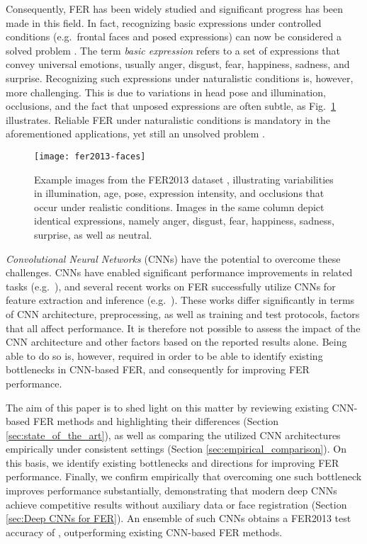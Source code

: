 \documentclass[conference,10pt,a4paper]{IEEEtran}
\begin{document}
Consequently, FER has been widely studied and significant progress has been made in this field. In fact, recognizing basic expressions under controlled conditions (e.g.~frontal faces and posed expressions) can now be considered a solved problem \cite{sariyanidi15}. The term \emph{basic expression} refers to a set of expressions that convey universal emotions, usually anger, disgust, fear, happiness, sadness, and surprise. Recognizing such expressions under naturalistic conditions is, however, more challenging. This is due to variations in head pose and illumination, occlusions, and the fact that unposed expressions are often subtle, as Fig.~\ref{fig:fer2013-faces} illustrates. Reliable FER under naturalistic conditions is mandatory in the aforementioned applications, yet still an unsolved problem \cite{sariyanidi15,martinez16}.

\begin{figure}[!t]
\centering
\texttt{[image: fer2013-faces]}
\caption{Example images from the FER2013 dataset \cite{goodfellow15}, illustrating variabilities in illumination, age, pose, expression intensity, and occlusions that occur under realistic conditions. Images in the same column depict identical expressions, namely anger, disgust, fear, happiness, sadness, surprise, as well as neutral.}
\label{fig:fer2013-faces}
\end{figure}



\emph{Convolutional Neural Networks} (CNNs) have the potential to overcome these challenges. CNNs have enabled significant performance improvements in related tasks (e.g.~\cite{krizhevsky12,he15,schroff15}), and several recent works on FER successfully utilize CNNs for feature extraction and inference (e.g.~\cite{tang13,yu15,kim16cvpr}). These works differ significantly in terms of CNN architecture, preprocessing, as well as training and test protocols, factors that all affect performance. It is therefore not possible to assess the impact of the CNN architecture and other factors based on the reported results alone. Being able to do so is, however, required in order to be able to identify existing bottlenecks in CNN-based FER, and consequently for improving FER performance.



The aim of this paper is to shed light on this matter by reviewing existing CNN-based FER methods and  highlighting their differences (Section \ref{sec:state_of_the_art}), as well as comparing the utilized CNN architectures empirically under consistent settings (Section \ref{sec:empirical_comparison}). On this basis, we identify existing bottlenecks and directions for improving FER performance. Finally, we confirm empirically that overcoming one such bottleneck improves performance substantially, demonstrating that modern deep CNNs achieve competitive results without auxiliary data or face registration (Section \ref{sec:Deep CNNs for FER}). An ensemble of such CNNs obtains a FER2013 \cite{goodfellow15} test accuracy of , outperforming existing CNN-based FER methods.
\end{document}
